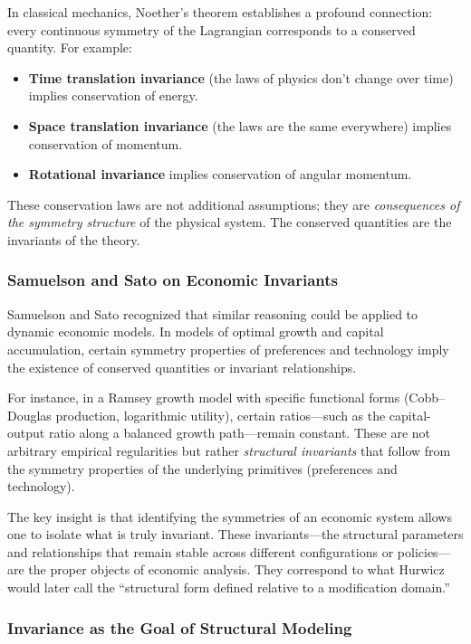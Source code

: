 \documentclass[12pt]{article}
\begin{document}
In classical mechanics, Noether's theorem establishes a profound connection: every continuous symmetry of the Lagrangian corresponds to a conserved quantity. For example:
\begin{itemize}
\item \textbf{Time translation invariance} (the laws of physics don't change over time) implies conservation of energy.
\item \textbf{Space translation invariance} (the laws are the same everywhere) implies conservation of momentum.
\item \textbf{Rotational invariance} implies conservation of angular momentum.
\end{itemize}

These conservation laws are not additional assumptions; they are \emph{consequences of the symmetry structure} of the physical system. The conserved quantities are the invariants of the theory.

\subsubsection{Samuelson and Sato on Economic Invariants}

Samuelson and Sato recognized that similar reasoning could be applied to dynamic economic models. In models of optimal growth and capital accumulation, certain symmetry properties of preferences and technology imply the existence of conserved quantities or invariant relationships.

For instance, in a Ramsey growth model with specific functional forms (Cobb--Douglas production, logarithmic utility), certain ratios---such as the capital-output ratio along a balanced growth path---remain constant. These are not arbitrary empirical regularities but rather \emph{structural invariants} that follow from the symmetry properties of the underlying primitives (preferences and technology).

The key insight is that identifying the symmetries of an economic system allows one to isolate what is truly invariant. These invariants---the structural parameters and relationships that remain stable across different configurations or policies---are the proper objects of economic analysis. They correspond to what Hurwicz would later call the ``structural form defined relative to a modification domain.''

\subsubsection{Invariance as the Goal of Structural Modeling}
\end{document}
